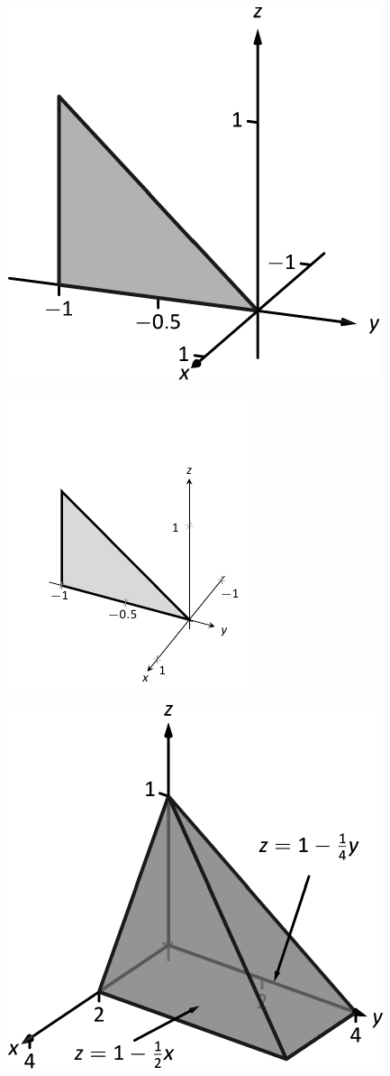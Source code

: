 \documentclass[10pt]{article}
\begin{document}
\includegraphics{figtrip3d_3DBW.pdf}
\texttt{}

\includegraphics{figtrip3dBW.pdf}
\texttt{}

\includegraphics{figtrip4_3DBW.pdf}
\texttt{}
\end{document}
